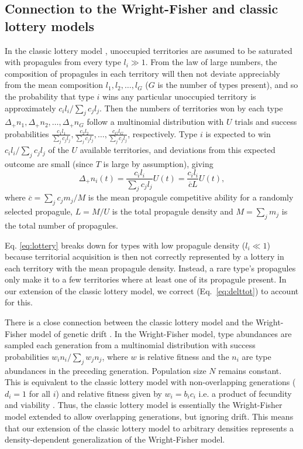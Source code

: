 \documentclass[11pt]{article}
\begin{document}
\subsection*{Connection to the Wright-Fisher and classic lottery models}

In the classic lottery model \citep{chesson_1981}, unoccupied territories are assumed to be saturated with propagules from every type $l_i\gg 1$. From the law of large numbers, the composition of propagules in each territory will then not deviate appreciably from the mean composition $l_1,l_2,\ldots,l_G$ ($G$ is the number of types present), and so the probability that type $i$ wins any particular unoccupied territory is approximately $c_i l_i/\sum_j c_j l_j$. Then the numbers of territories won by each type $\Delta_+ n_1,\Delta_+ n_2,\ldots,\Delta_+ n_G$ follow a multinomial distribution with $U$ trials and success probabilities $\frac{c_1 l_1}{\sum_j c_j l_j},\frac{c_2 l_2}{\sum_j c_j l_j},\ldots,\frac{c_G l_G}{\sum_j c_j l_j}$, respectively. Type $i$ is expected to win $c_i l_i/\sum_j c_j l_j$ of the $U$ available territories, and deviations from this expected outcome are small (since $T$ is large by assumption), giving 
\begin{equation}
\Delta_+ n_i(t)=\frac{c_i l_i}{\sum_j c_j l_j}U(t)=\frac{c_i l_i}{\overline{c}L}U(t), \label{eq:lottery}
\end{equation}
where $\overline{c}=\sum_j c_j m_j/M$ is the mean propagule competitive ability for a randomly selected propagule, $L=M/U$ is the total propagule density and $M=\sum_j m_j$ is the total number of propagules. 

Eq. \eqref{eq:lottery} breaks down for types with low propagule density ($l_i\ll 1$) because territorial acquisition is then not correctly represented by a lottery in each territory with the mean propagule density. Instead, a rare type's propagules only make it to a few territories where at least one of its propagule present. In our extension of the classic lottery model, we correct (Eq.~\ref{eq:delttot}) to account for this.
 
There is a close connection between the classic lottery model and the Wright-Fisher model of genetic drift \citep{svardal_2015}. In the Wright-Fisher model, type abundances are sampled each generation from a multinomial distribution with success probabilities $w_i n_i/\sum_j w_j n_j$, where $w$ is relative fitness and the $n_i$ are  type abundances in the preceding generation. Population size $N$ remains constant. This is equivalent to the classic lottery model with non-overlapping generations ($d_i=1$ for all $i$) and relative fitness given by $w_i=b_i c_i$ i.e. a product of fecundity and viability \citep[pp. 185]{crow_1970}. Thus, the classic lottery model is essentially the Wright-Fisher model extended to allow overlapping generations, but ignoring drift. This means that our extension of the classic lottery model to arbitrary densities represents a density-dependent generalization of the Wright-Fisher model.
\end{document}
